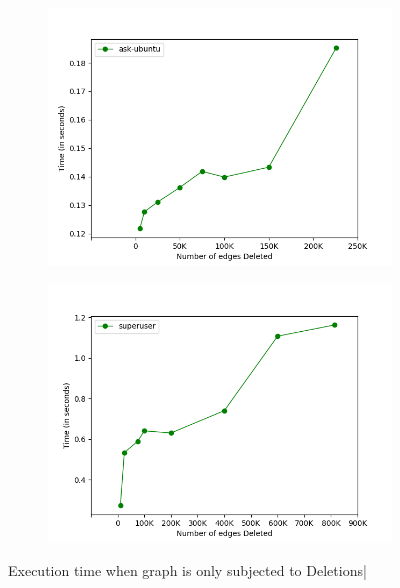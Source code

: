 \documentclass[a4paper]{article}
\begin{document}
\begin{figure}[H]
\begin{subfigure}[b]{0.48\textwidth}
         \caption{}
         \label{fig:deletion_trend_2}
    \end{subfigure}
    \hfill
    \begin{subfigure}[b]{0.48\textwidth}
         \centering
         \includegraphics[width=\textwidth]{img/del/d3.png}
         \caption{}
         \label{fig:deletion_trend_3}
    \end{subfigure}
    \hfill
    \begin{subfigure}[b]{0.48\textwidth}
         \centering
         \includegraphics[width=\textwidth]{img/del/d4.png}
         \caption{}
         \label{fig:deletion_trend_4}
    \end{subfigure}
    \caption{Execution time when graph is only subjected to Deletions|}%
    \label{fig:deletion_trend}
\end{figure}
\end{document}
